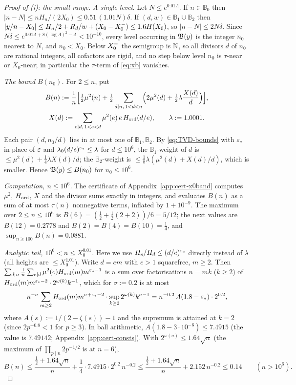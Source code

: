 \begin{proof}[Proof of (i): the small range]
\emph{A single level.} Let $N\le e^{0.01\Lambda}$. If $n\in\mathbb B_0$ then $|n-N|\le nH_n/(2X_0)\le0.51\,(1.01N)\delta$.
If $(d,w)\in\mathbb B_1\cup\mathbb B_2$ then $|y/n-X_0|\le H_n/2+R_d/w+(X_0-X_0^{-})\le1.6H(X_0)$, so $|n-N|\le2N\delta$. Since
$N\delta\le e^{0.01\Lambda+8(\log\Lambda)^2-\Lambda}<10^{-10}$, every level occurring in $\mathfrak{B}(y)$ is the integer $n_0$
nearest to $N$, and $n_0<X_0$. Below $X_0^{-}$ the semigroup is $\mathbb{N}$, so all divisors $d$ of $n_0$ are rational integers, all
cofactors are rigid, and no step below level $n_0$ is $\tau$-near or $X_0$-near; in particular the $\tau$-term of
\eqref{eq:xb} vanishes.

\emph{The bound $B(n_0)$.} For $2\le n$, put
\begin{gather*}
  B(n):=\frac1n\Bigl[\tfrac12\mu^2(n)+\tfrac12\sum_{d\mid n,\,1<d<n}\Bigl(2\mu^2(d)+\tfrac12\lambda\frac{X(d)}d\Bigr)\Bigr],\\
  X(d):=\sum_{e\mid d,\,1<e<d}\mu^2(e)\,e\,H_{\mathrm{ord}}(d/e),\qquad\lambda:=1.0001 .
\end{gather*}
Each pair $(d,n_0/d)$ lies in at most one of $\mathbb B_1,\mathbb B_2$. By \eqref{eq:TVD-bounds} with $\varepsilon_*$ in place of
$\varepsilon$ and $\lambda_0(d/e)^{\varepsilon_*}\le\lambda$ for $d\le10^6$, the $\mathbb B_1$-weight of $d$ is $\le\mu^2(d)+\frac14\lambda X(d)/d$;
the $\mathbb B_2$-weight is $\le\frac18\lambda(\mu^2(d)+X(d)/d)$, which is smaller. Hence $\mathfrak{B}(y)\le B(n_0)$ for
$n_0\le10^6$.

\emph{Computation, $n\le10^6$.} The certificate of Appendix~\ref{app:cert-x0band} computes $\mu^2$, $H_{\mathrm{ord}}$, $X$ and the divisor
sums exactly in integers, and evaluates $B(n)$ as a sum of at most $\tau(n)$ nonnegative terms, inflated by $1+10^{-9}$.
The maximum over $2\le n\le10^6$ is $B(6)=(\frac12+\frac12(2+2))/6=5/12$; the next values are $B(12)=0.2778$ and
$B(2)=B(4)=B(10)=\frac14$, and $\sup_{n\ge100}B(n)=0.0881$.

\emph{Analytic tail, $10^6<n\le X_0^{0.01}$.} Here we use $H_e/H_d\le(d/e)^{\varepsilon_*}$ directly instead of $\lambda$ (all heights are $\le X_0^{1.01}$). Write
$d=em$ with $e>1$ squarefree, $m\ge2$. Then $\sum_{d\mid n}\frac1n\sum_{e\mid d}\mu^2(e)H_{\mathrm{ord}}(m)m^{\varepsilon_*-1}$ is a sum over
factorisations $n=mk$ ($k\ge2$) of $H_{\mathrm{ord}}(m)m^{\varepsilon_*-2}\cdot2^{\omega(k)}k^{-1}$, which for $\sigma:=0.2$ is at most
\[
  n^{-\sigma}\sum_{m\ge2}H_{\mathrm{ord}}(m)m^{\sigma+\varepsilon_*-2}\cdot\sup_{k\ge2}2^{\omega(k)}k^{\sigma-1}
  =n^{-0.2}\,A(1.8-\varepsilon_*)\cdot2^{0.2},
\]
where $A(s):=1/(2-\zeta(s))-1$ and the supremum is attained at $k=2$ (since $2p^{-0.8}<1$ for $p\ge3$). In ball arithmetic,
$A(1.8-3\cdot10^{-6})\le7.4915$ (the value is $7.49142$; Appendix~\ref{app:cert-consts}). With $2^{\omega(n)}\le1.64\sqrt n$ (the maximum of $\prod_{p\mid n}2p^{-1/2}$ is at $n=6$),
\[
  B(n)\le\frac{\frac12+1.64\sqrt n}{n}+\frac14\cdot7.4915\cdot2^{0.2}\,n^{-0.2}\le\frac{\frac12+1.64\sqrt n}{n}+2.152\,n^{-0.2}
  \le0.14\qquad(n>10^6).
\]


\end{proof}
